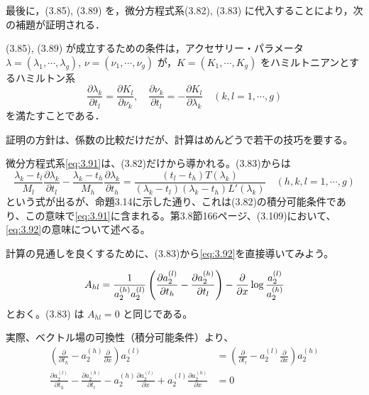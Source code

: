 \begin{story}

最後に，(3.85), (3.89) を，微分方程式系(3.82), (3.83) に代入することにより，次の補題が証明される．

\begin{lemma}[3.9]
    (3.85), (3.89) が成立するための条件は，アクセサリー・パラメータ $\lambda = (\lambda_1, \cdots, \lambda_g)$, $\nu = (\nu_1, \cdots, \nu_g)$ が，$K = (K_1, \cdots, K_g)$ をハミルトニアンとするハミルトン系
    \begin{equation}
        \frac{\partial \lambda_k}{\partial t_l} = \frac{\partial K_l}{\partial \nu_k}, \quad 
        \frac{\partial \nu_k}{\partial t_l} = - \frac{\partial K_l}{\partial \lambda_k} \quad 
        (k,l = 1, \cdots, g)
        \tag{3.91}\label{eq:3.91}
    \end{equation}
    を満たすことである．
\end{lemma}

証明の方針は、係数の比較だけだが、計算はめんどうで若干の技巧を要する。

微分方程式系\eqref{eq:3.91}は、(3.82)だけから導かれる。(3.83)からは
\begin{equation}
    \frac{\lambda_k - t_l}{M_l} \frac{\partial \lambda_k}{\partial t_l} - \frac{\lambda_k - t_h}{M_h} \frac{\partial \lambda_k}{\partial t_h} 
    = \frac{(t_l - t_h) T(\lambda_k)}{(\lambda_k - t_l)(\lambda_k - t_h) L'(\lambda_k)} \quad 
    (h, k, l = 1, \cdots, g)
    \label{eq:3.92}
\end{equation}
という式が出るが、命題3.14に示した通り、これは(3.82)の積分可能条件であり、この意味で\eqref{eq:3.91}に含まれる。第3.8節166ページ、(3.109)において、\eqref{eq:3.92}の意味について述べる。

計算の見通しを良くするために、(3.83)から\eqref{eq:3.92}を直接導いてみよう。

\begin{equation}
    A_{hl} = \frac{1}{a_2^{(h)} a_2^{(l)}} \left( \frac{\partial a_2^{(l)}}{\partial t_h} - \frac{\partial a_2^{(h)}}{\partial t_l} \right) - \frac{\partial}{\partial x} \log \frac{a_2^{(l)}}{a_2^{(h)}} \notag
\end{equation}
とおく。(3.83) は $A_{hl} = 0$ と同じである。

\end{story}
実際、ベクトル場の可換性（積分可能条件）より、
\begin{align*}
    \left(\frac{\partial}{\partial t_h} - a_2^{(h)} \frac{\partial}{\partial x}\right) a_2^{(l)} &= \left(\frac{\partial}{\partial t_l} - a_2^{(l)} \frac{\partial}{\partial x}\right) a_2^{(h)} \\
    \frac{\partial a_2^{(l)}}{\partial t_h} - \frac{\partial a_2^{(h)}}{\partial t_l} - a_2^{(h)} \frac{\partial a_2^{(l)}}{\partial x} + a_2^{(l)} \frac{\partial a_2^{(h)}}{\partial x} &= 0
\end{align*}
